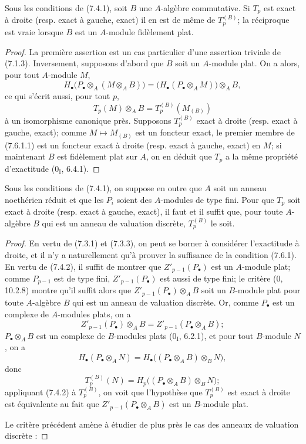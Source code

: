 \begin{proposition}[7.6.1]
Sous les conditions de (7.4.1), soit $B$ une $A$-algèbre commutative. Si $T_p$
est exact à droite (resp. exact à gauche, exact) il en est de même de
$T_p^{(B)}$; la réciproque est vraie lorsque $B$ est un $A$-module fidèlement
plat.
\end{proposition}

\begin{proof}
La première assertion est un cas particulier d'une assertion triviale de
(7.1.3). Inversement, supposons d'abord que $B$ soit un $A$-module plat. On a
alors, pour tout $A$-module $M$,
\[
  H_\bullet\bigl(P_\bullet\otimes_A(M\otimes_A B)\bigr)
  =
  \bigl(H_\bullet(P_\bullet\otimes_A M)\bigr)\otimes_A B,
\]
ce qui s'écrit aussi, pour tout $p$,
\[
  T_p(M)\otimes_A B
  =
  T_p^{(B)}(M_{(B)})
  \tag{7.6.1.1}\label{III.7.6.1.1.fr}
\]
à un isomorphisme canonique près. Supposons $T_p^{(B)}$ exact à droite (resp.
exact à gauche, exact); comme $M\mapsto M_{(B)}$ est un foncteur exact, le
premier membre de (7.6.1.1) est un foncteur exact à droite (resp. exact à
gauche, exact) en $M$; si maintenant $B$ est fidèlement plat sur $A$, on en
déduit que $T_p$ a la même propriété d'exactitude ($0_{\mathrm I}$, 6.4.1).
\end{proof}

\begin{proposition}[7.6.2]
Sous les conditions de (7.4.1), on suppose en outre que $A$ soit un anneau
noethérien réduit et que les $P_i$ soient des $A$-modules de type fini. Pour que
$T_p$ soit exact à droite (resp. exact à gauche, exact), il faut et il suffit
que, pour toute $A$-algèbre $B$ qui est un anneau de valuation discrète,
$T_p^{(B)}$ le soit.
\end{proposition}

\begin{proof}
En vertu de (7.3.1) et (7.3.3), on peut se borner à considérer l'exactitude à
droite, et il n'y a naturellement qu'à prouver la suffisance de la condition
(7.6.1). En vertu de (7.4.2), il suffit de montrer que
$Z'_{p-1}(P_\bullet)$ est un $A$-module plat; comme $P_{p-1}$ est de type fini,
$Z'_{p-1}(P_\bullet)$ est aussi de type fini; le critère ($0$, 10.2.8) montre
qu'il suffit alors que $Z'_{p-1}(P_\bullet)\otimes_A B$ soit un $B$-module plat
pour toute $A$-algèbre $B$ qui est un anneau de valuation discrète. Or, comme
$P_\bullet$ est un complexe de $A$-modules plats, on a
\[
  Z'_{p-1}(P_\bullet)\otimes_A B
  =
  Z'_{p-1}(P_\bullet\otimes_A B);
\]
$P_\bullet\otimes_A B$ est un complexe de $B$-modules plats
($0_{\mathrm I}$, 6.2.1), et pour tout $B$-module $N$, on a
\[
  H_\bullet(P_\bullet\otimes_A N)
  =
  H_\bullet\bigl((P_\bullet\otimes_A B)\otimes_B N\bigr),
\]
donc
\[
  T_p^{(B)}(N)
  =
  H_p\bigl((P_\bullet\otimes_A B)\otimes_B N\bigr);
\]
appliquant (7.4.2) à $T_p^{(B)}$, on voit que l'hypothèse que $T_p^{(B)}$ est
exact à droite est équivalente au fait que $Z'_{p-1}(P_\bullet\otimes_A B)$ est
un $B$-module plat.

Le critère précédent amène à étudier de plus près le cas des anneaux de
valuation discrète :
\end{proof}


